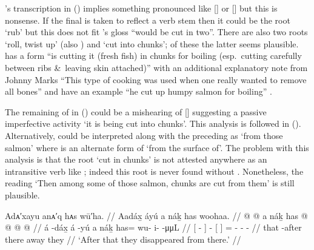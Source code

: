 \citeauthor{swanton:1909}’s transcription  in (\lastx) implies something pronounced like  [] or  [] but this is nonsense.
If the final  is taken to reflect a verb stem then it could be the root  ‘rub’ but this does not fit \citeauthor{swanton:1909}’s gloss “would be cut in two”.
There are also two roots  ‘roll, twist up’ (also ) and  ‘cut into chunks’; of these the latter seems plausible.
\citeauthor{leer:1976} has a form  “is cutting it (fresh fish) in chunks for boiling (esp.\ cutting carefully between ribs \&\ leaving skin attached)” with an additional explanatory note from Johnny Marks “This type of cooking was used when one really wanted to remove all bones” \parencite[344–345]{leer:1976} and \citeauthor{story-naish:1973} have an example  “he cut up humpy salmon for boiling” \parencite[61]{story-naish:1973}.

The remaining  of  in (\lastx) could be a mishearing of  [] suggesting a passive imperfective activity  ‘it is being cut into chunks’.
This analysis is followed in (\lastx).
Alternatively,  could be interpreted along with the preceding  as  ‘from those salmon’ where  is an alternate form of  ‘from the surface of’.
The problem with this analysis is that the root  ‘cut in chunks’ is not attested anywhere as an intransitive verb like ; indeed this root is never found without .
Nonetheless, the reading  ‘Then among some of those salmon, chunks are cut from them’ is still plausible.

\ex\label{ex:100-89-disappeared}%
%
\begingl
	\glpreamble	Adᴀ′xayu anᴀ′q hᴀs wū′ha. //
	\glpreamble	Aadáx̱ áyú a náḵ has woohaa. //
	\gla	{}  @ {} {}  @ {} 
		{} a náḵ {} 
		has @  @ {} @ {} @ {} //
	\glb	{} á -dáx̱ {} á -yú
		{} a náḵ {} 
		has= wu- i-  -μμL //
	\glc	{}[  - {}]  -
		{}[   {}]
		= - -  - //
	\gld	{} that -after {}  {} 
		{} there away {} 
		they  {} {} {} {} //
	\glft	‘After that they disappeared from there.’
		//
\endgl
\xe


